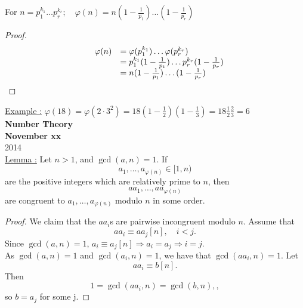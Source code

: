 \documentclass{report}
\begin{document}
\begin{thm}
				For $n=p_1^{k_1}\dots p_r^{k_r} ;\quad \varphi(n)=n(1-\frac{1}{p_1})\dots(1-\frac{1}{p_r})$
\end{thm}
\begin{proof}
					\[ 	\begin{array}{l c l}
							&\varphi(n)&=\varphi(p_1^{k_1})\dots\varphi(p_r^{k_r})\\
							&&=p_1^{k_1}(1-\frac{1}{p_1})\dots p_r^{k_r}(1-\frac{1}{p_r})\\
							&&=n(1-\frac{1}{p_1})\dots (1-\frac{1}{p_r})\\
							\end{array}
					\]
\end{proof}
\underline{Example :} $\varphi(18)=\varphi(2 \cdot 3^2)=18(1-\frac{1}{2})(1-\frac{1}{3}) = 18 \frac{1}{2} \frac{2}{3}=6$\\
\newpage
{\centering
\Large
\textbf{Number Theory}\\
\normalsize
\textbf{November xx}\\
2014\\
}
\vspace{10mm}
\underline{Lemma :} Let $n>1$, and $\gcd(a, n)=1$. If 
\begin{equation*}
a_1, \dots, a_{\varphi(n)}\in [1, n)
\end{equation*} 
are the positive integers which are relatively prime to $n$, then 
\begin{equation*}
aa_1, \dots, aa_{\varphi(n)}
\end{equation*}
are congruent to $a_1, \dots, a_{\varphi(n)}$ modulo $n$ in some order.
\begin{proof}
	We claim that the $aa_i$s are pairwise incongruent modulo $n$. Assume that
\begin{equation*}
aa_i\equiv aa_j[n], \quad i<j.
\end{equation*}
Since $\gcd(a, n) = 1$, $a_i\equiv a_j[n] \Rightarrow a_i=a_j \Rightarrow i=j$.\\
As $\gcd(a, n)=1$ and $\gcd(a_i, n) = 1$, we have that $\gcd(aa_i, n)=1$. Let 
\begin{equation*}
aa_i\equiv b[n].
\end{equation*}
Then 
\begin{equation*}
1=\gcd(aa_i, n) = \gcd(b, n),,
\end{equation*}
so $b=a_j$ for some j.
\end{proof}
\end{document}
